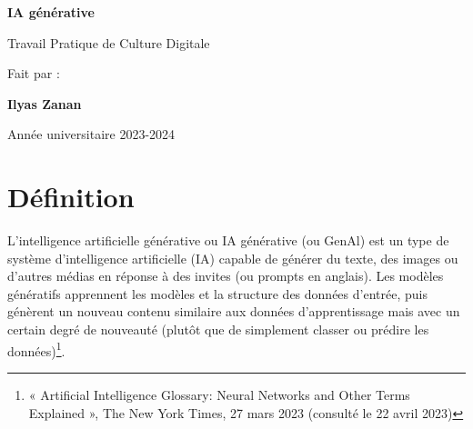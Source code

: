 \documentclass[12pt,a4paper]{article}
\begin{document}
\begin{titlepage}
    \centering
    \vspace*{2cm}
    
    {\huge\bfseries\sffamily IA générative\par}
    
    \vspace{1.5cm}
    
    {\Large \sffamily Travail Pratique de Culture Digitale\par}
    
    \vfill %
    
    {\Large Fait par :\par}
    \vspace{0.5cm}
    {\Huge\bfseries Ilyas Zanan\par}
    
    \vfill %
    
    {\large Année universitaire 2023-2024\par}
    
    \clearpage
\end{titlepage}


\pagestyle{fancy} %
\renewcommand{\contentsname}{Table des matières}
\tableofcontents
\newpage


\section{Définition}

L'intelligence artificielle générative ou IA générative (ou GenAl) est un type de système d'intelligence artificielle (IA) capable de générer du texte, des images ou d'autres médias en réponse à des invites (ou prompts en anglais). Les modèles génératifs apprennent les modèles et la structure des données d'entrée, puis génèrent un nouveau contenu similaire aux données d'apprentissage mais avec un certain degré de nouveauté (plutôt que de simplement classer ou prédire les données)\footnote{« Artificial Intelligence Glossary: Neural Networks and Other Terms Explained », The New York Times, 27 mars 2023 (consulté le 22 avril 2023)}.
\end{document}
